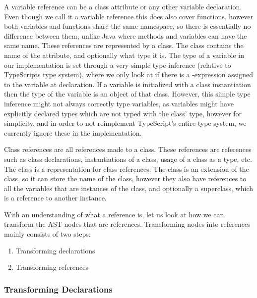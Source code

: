 A variable reference can be a class attribute or any other variable declaration.
Even though we call it a variable reference this does also cover functions, however both variables and functions share the same namespace, so there is essentially no difference between them, unlike Java where methods and variables can have the same name.
These references are represented by a  class.
The class contains the name of the attribute, and optionally what type it is.
The type of a variable in our implementation is set through a very simple type-inference (relative to TypeScripts type system), where we only look at if there is a -expression assigned to the variable at declaration.
If a variable is initialized with a class instantiation then the type of the variable is an object of that class.
However, this simple type inference might not always correctly type variables, as variables might have explicitly declared types which are not typed with the class' type, however for simplicity, and in order to not reimplement TypeScript's entire type system, we currently ignore these in the implementation.

Class references are all references made to a class.
These references are references such as class declarations, instantiations of a class, usage of a class as a type, etc.
The  class is a representation for class references.
The class is an extension of the  class, so it can store the name of the class, however they also have references to all the variables that are instances of the class, and optionally a superclass, which is a reference to another  instance.

With an understanding of what a reference is, let us look at how we can transform the AST nodes that are references.
Transforming nodes into references mainly consists of two steps:

\begin{enumerate}
    \item Transforming declarations
    \item Transforming references
\end{enumerate}

\subsubsection{Transforming Declarations}


